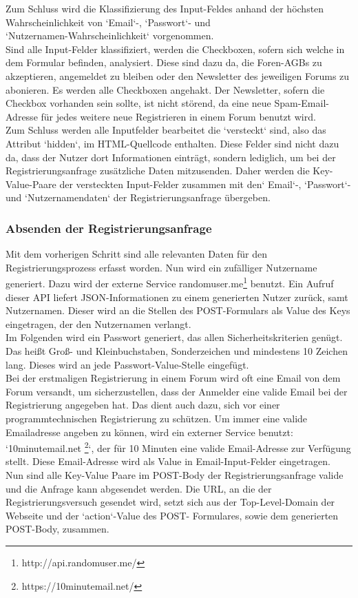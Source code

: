 Zum Schluss wird die Klassifizierung des Input-Feldes anhand der höchsten Wahrscheinlichkeit von `Email`-, `Passwort`- und \\`Nutzernamen-Wahrscheinlichkeit` vorgenommen. \\
Sind alle Input-Felder klassifiziert, werden die Checkboxen, sofern sich welche in dem Formular befinden, analysiert. Diese sind dazu da, die Foren-AGBs zu akzeptieren, angemeldet zu bleiben oder den Newsletter des jeweiligen Forums zu abonieren.
Es werden alle Checkboxen angehakt. Der Newsletter, sofern die Checkbox vorhanden sein sollte, ist nicht störend, da eine neue Spam-Email-Adresse für jedes weitere neue Registrieren in einem Forum benutzt wird.\\
Zum Schluss werden alle Inputfelder bearbeitet die `versteckt` sind, also das Attribut `hidden`, im HTML-Quellcode enthalten.
Diese Felder sind nicht dazu da, dass der Nutzer dort Informationen einträgt, sondern lediglich, um bei der Registrierungsanfrage zusätzliche Daten mitzusenden. Daher werden die Key-Value-Paare der versteckten Input-Felder zusammen mit den` Email`-, `Passwort`- und `Nutzernamendaten` der Registrierungsanfrage übergeben.

\subsubsection{Absenden der Registrierungsanfrage}
Mit dem vorherigen Schritt sind alle relevanten Daten für den Registrierungsprozess erfasst worden. Nun wird ein zufälliger Nutzername generiert. Dazu wird der externe Service randomuser.me\footnote{http://api.randomuser.me/} benutzt. Ein Aufruf dieser API liefert JSON-Informationen zu einem generierten Nutzer zurück, samt Nutzernamen. Dieser wird an die Stellen des POST-Formulars als Value des Keys eingetragen, der den Nutzernamen verlangt.\\
Im Folgenden wird ein Passwort generiert, das allen Sicherheitskriterien genügt. Das heißt Groß- und Kleinbuchstaben, Sonderzeichen und mindestens 10 Zeichen lang. Dieses wird an jede Passwort-Value-Stelle eingefügt.\\
Bei der erstmaligen Registrierung in einem Forum wird oft eine Email von dem Forum versandt, um sicherzustellen, dass der Anmelder eine valide Email bei der Registrierung angegeben hat. Das dient auch dazu, sich vor einer programmtechnischen Registrierung zu schützen. Um immer eine valide Emailadresse angeben zu können, wird ein externer Service benutzt: `10minutemail.net \footnote{https://10minutemail.net/}`, der für 10 Minuten eine valide Email-Adresse zur Verfügung stellt. Diese Email-Adresse wird als Value in Email-Input-Felder eingetragen.\\
Nun sind alle Key-Value Paare im POST-Body der Registrierungsanfrage valide und die Anfrage kann abgesendet werden.
Die URL, an die der Registrierungsversuch gesendet wird, setzt sich aus der Top-Level-Domain der Webseite und der `action`-Value des POST- Formulares, sowie dem generierten POST-Body, zusammen.

